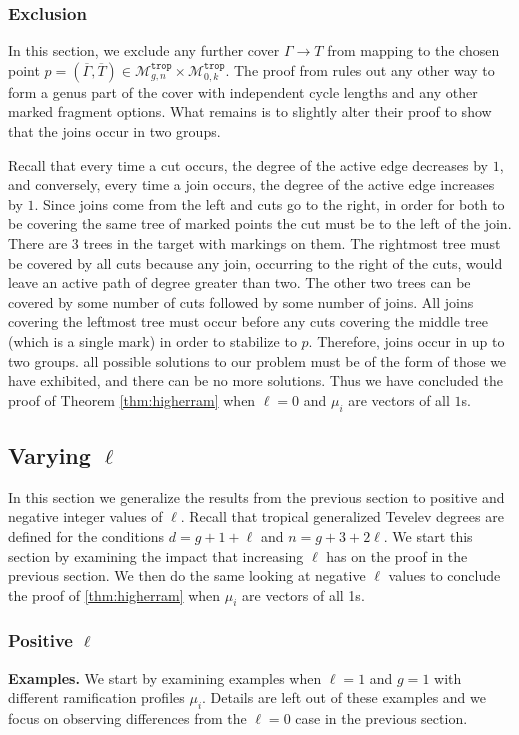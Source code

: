 \documentclass[11pt,reqno]{amsart}
\theoremstyle{definition}
\newcommand\trop{{\mathtt{trop}}}
\newcommand\Mgn[1]{\mathcal M_{#1}}
\begin{document}
 \subsubsection*{Exclusion}\label{sec:excludegentev}
In this section, we exclude any further cover $\Gamma \to T$ from mapping to  the chosen point $p= (\overline{\Gamma},\overline{T})\in \Mgn{g,n}^\trop\times \Mgn{0,k}^\trop$. The proof from \cite{troptev} rules out any other way to form a genus part of the cover with independent cycle lengths and any other marked fragment options. What remains is to slightly alter their proof to show that the joins occur in two groups.

Recall that every time a cut occurs, the degree of the active edge decreases by $1$, and conversely, every time a join occurs, the degree of the active edge increases by $1$. Since joins come from the left and cuts go to the right, in order for both to be covering the same tree of marked points the cut must be to the left of the join. There are $3$ trees in the target with markings on them. The rightmost tree must be covered by all cuts because any join, occurring to the right of the cuts, would leave an active path of degree greater than two. The other two trees can be covered by some number of cuts followed by some number of joins. All joins covering the leftmost tree must occur before any cuts covering the middle tree (which is a single mark) in order to stabilize to $p$. Therefore, joins occur in up to two groups. all possible solutions to our problem must be of the form of those we have exhibited, and there can be no more solutions.
Thus we have concluded the proof of Theorem \ref{thm:higherram} when $\ell=0$ and $\mu_i$ are vectors of all $1$s.
    
 \subsection{Varying $\ell$}
 
 In this section we generalize the results from the previous section to positive and negative integer values of $\ell$. Recall that tropical generalized Tevelev degrees are defined for the conditions $d=g+1+\ell$ and $n=g+3+2\ell$. We start this section by examining the impact that increasing $\ell$ has on the proof in the previous section. We then do the same looking at negative $\ell$ values to conclude the proof of \ref{thm:higherram} when $\mu_i$ are vectors of all 1s.
 
    \subsubsection*{Positive $\ell$}
    \vspace{0.5em}
    \noindent\textbf{Examples.} We start by examining examples when $\ell=1$ and $g=1$ with different ramification profiles $\mu_i$. Details are left out of these examples and we focus on observing differences from the $\ell=0$ case in the previous section. 
\end{document}
